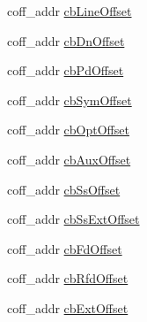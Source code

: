 \begin{DoxyCompactItemize}
coff\_\-addr \hyperlink{structecoff__symhdr_a84e0ba4e486829b6f30d162617e6bfb3}{cbLineOffset}
\item 
coff\_\-addr \hyperlink{structecoff__symhdr_a6c1463b0d062503dac9f377b9b289130}{cbDnOffset}
\item 
coff\_\-addr \hyperlink{structecoff__symhdr_ababba0becb472e3b3cf25b38f0f7605c}{cbPdOffset}
\item 
coff\_\-addr \hyperlink{structecoff__symhdr_aaa2e75d9b891100ab20a7f037829e783}{cbSymOffset}
\item 
coff\_\-addr \hyperlink{structecoff__symhdr_a8a8b25ed1cd2cc33b98cb0c946c7c30a}{cbOptOffset}
\item 
coff\_\-addr \hyperlink{structecoff__symhdr_a769a104ee5db5d463dedcab3cfd78a0e}{cbAuxOffset}
\item 
coff\_\-addr \hyperlink{structecoff__symhdr_acae7b7c0b204866c11261425b116ae04}{cbSsOffset}
\item 
coff\_\-addr \hyperlink{structecoff__symhdr_abb4b8290c2ee1931706ae814cc6a20cf}{cbSsExtOffset}
\item 
coff\_\-addr \hyperlink{structecoff__symhdr_a4ed49b4e8ba269159605902ea1441b0e}{cbFdOffset}
\item 
coff\_\-addr \hyperlink{structecoff__symhdr_a73678c3f4a78ecc5d7ebfa7c56003938}{cbRfdOffset}
\item 
coff\_\-addr \hyperlink{structecoff__symhdr_aab99be820e48b5bfcda25cd46133cf9a}{cbExtOffset}
\end{DoxyCompactItemize}


